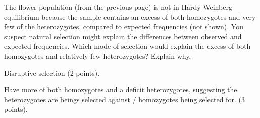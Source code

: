 \question[5]
The flower population (from the previous page) is not in Hardy-Weinberg equilibrium because the sample contains an excess of both homozygotes and very few of the heterozygotes, compared to expected frequencies (not shown).  You suspect natural selection might explain the differences between observed and expected frequencies.  Which mode of selection would explain the excess of both homozygotes and relatively few heterozygotes?  Explain why. 

\begin{solution}
Disruptive selection (2 points). 

Have more of both homozygotes and a deficit heterozygotes, suggesting the heterozygotes are beings selected against / homozygotes being selected for. (3 points).

\end{solution}
